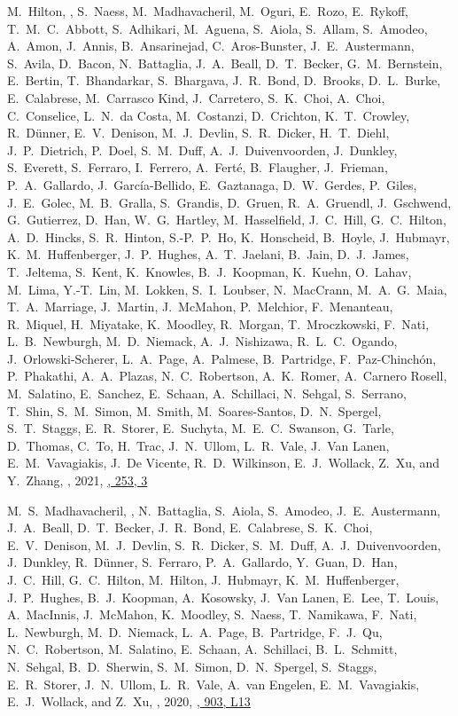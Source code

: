\item
M.~Hilton, \myself, S.~Naess, M.~Madhavacheril, M.~Oguri, E.~Rozo, E.~Rykoff, T.~M.~C.~Abbott, S.~Adhikari, M.~Aguena, S.~Aiola, S.~Allam, S.~Amodeo, A.~Amon, J.~Annis, B.~Ansarinejad, C.~Aros-Bunster, J.~E.~Austermann, S.~Avila, D.~Bacon, N.~Battaglia, J.~A.~Beall, D.~T.~Becker, G.~M.~Bernstein, E.~Bertin, T.~Bhandarkar, S.~Bhargava, J.~R.~Bond, D.~Brooks, D.~L.~Burke, E.~Calabrese, M.~Carrasco Kind, J.~Carretero, S.~K.~Choi, A.~Choi, C.~Conselice, L.~N.~da Costa, M.~Costanzi, D.~Crichton, K.~T.~Crowley, R.~Dünner, E.~V.~Denison, M.~J.~Devlin, S.~R.~Dicker, H.~T.~Diehl, J.~P.~Dietrich, P.~Doel, S.~M.~Duff, A.~J.~Duivenvoorden, J.~Dunkley, S.~Everett, S.~Ferraro, I.~Ferrero, A.~Ferté, B.~Flaugher, J.~Frieman, P.~A.~Gallardo, J.~García-Bellido, E.~Gaztanaga, D.~W.~Gerdes, P.~Giles, J.~E.~Golec, M.~B.~Gralla, S.~Grandis, D.~Gruen, R.~A.~Gruendl, J.~Gschwend, G.~Gutierrez, D.~Han, W.~G.~Hartley, M.~Hasselfield, J.~C.~Hill, G.~C.~Hilton, A.~D.~Hincks, S.~R.~Hinton, S.-P.~P.~Ho, K.~Honscheid, B.~Hoyle, J.~Hubmayr, K.~M.~Huffenberger, J.~P.~Hughes, A.~T.~Jaelani, B.~Jain, D.~J.~James, T.~Jeltema, S.~Kent, K.~Knowles, B.~J.~Koopman, K.~Kuehn, O.~Lahav, M.~Lima, Y.-T.~Lin, M.~Lokken, S.~I.~Loubser, N.~MacCrann, M.~A.~G.~Maia, T.~A.~Marriage, J.~Martin, J.~McMahon, P.~Melchior, F.~Menanteau, R.~Miquel, H.~Miyatake, K.~Moodley, R.~Morgan, T.~Mroczkowski, F.~Nati, L.~B.~Newburgh, M.~D.~Niemack, A.~J.~Nishizawa, R.~L.~C.~Ogando, J.~Orlowski-Scherer, L.~A.~Page, A.~Palmese, B.~Partridge, F.~Paz-Chinchón, P.~Phakathi, A.~A.~Plazas, N.~C.~Robertson, A.~K.~Romer, A.~Carnero Rosell, M.~Salatino, E.~Sanchez, E.~Schaan, A.~Schillaci, N.~Sehgal, S.~Serrano, T.~Shin, S.~M.~Simon, M.~Smith, M.~Soares-Santos, D.~N.~Spergel, S.~T.~Staggs, E.~R.~Storer, E.~Suchyta, M.~E.~C.~Swanson, G.~Tarle, D.~Thomas, C.~To, H.~Trac, J.~N.~Ullom, L.~R.~Vale, J.~Van Lanen, E.~M.~Vavagiakis, J.~De Vicente, R.~D.~Wilkinson, E.~J.~Wollack, Z.~Xu, and Y.~Zhang,
,
2021, \href{https://ui.adsabs.harvard.edu/abs/2021ApJS..253....3H}{\apjs, 253, 3}

\item
M.~S.~Madhavacheril, \myself, N.~Battaglia, S.~Aiola, S.~Amodeo, J.~E.~Austermann, J.~A.~Beall, D.~T.~Becker, J.~R.~Bond, E.~Calabrese, S.~K.~Choi, E.~V.~Denison, M.~J.~Devlin, S.~R.~Dicker, S.~M.~Duff, A.~J.~Duivenvoorden, J.~Dunkley, R.~Dünner, S.~Ferraro, P.~A.~Gallardo, Y.~Guan, D.~Han, J.~C.~Hill, G.~C.~Hilton, M.~Hilton, J.~Hubmayr, K.~M.~Huffenberger, J.~P.~Hughes, B.~J.~Koopman, A.~Kosowsky, J.~Van Lanen, E.~Lee, T.~Louis, A.~MacInnis, J.~McMahon, K.~Moodley, S.~Naess, T.~Namikawa, F.~Nati, L.~Newburgh, M.~D.~Niemack, L.~A.~Page, B.~Partridge, F.~J.~Qu, N.~C.~Robertson, M.~Salatino, E.~Schaan, A.~Schillaci, B.~L.~Schmitt, N.~Sehgal, B.~D.~Sherwin, S.~M.~Simon, D.~N.~Spergel, S.~Staggs, E.~R.~Storer, J.~N.~Ullom, L.~R.~Vale, A.~van Engelen, E.~M.~Vavagiakis, E.~J.~Wollack, and Z.~Xu,
,
2020, \href{https://ui.adsabs.harvard.edu/abs/2020ApJ...903L..13M}{\apjl, 903, L13}

